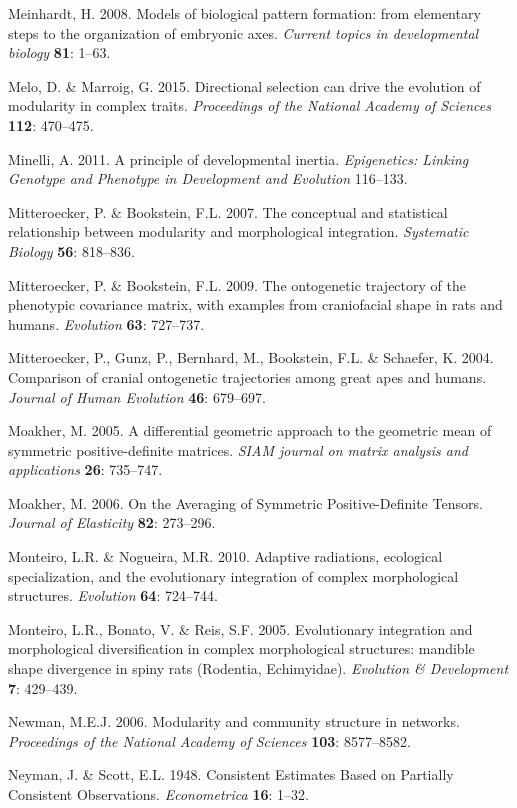 \documentclass[12pt,twoside]{report}
\begin{document}
Meinhardt, H. 2008. Models of biological pattern formation: from
elementary steps to the organization of embryonic axes. \emph{Current
topics in developmental biology} \textbf{81}: 1--63.

Melo, D. \& Marroig, G. 2015. Directional selection can drive the
evolution of modularity in complex traits. \emph{Proceedings of the
National Academy of Sciences} \textbf{112}: 470--475.

Minelli, A. 2011. A principle of developmental inertia.
\emph{Epigenetics: Linking Genotype and Phenotype in Development and
Evolution} 116--133.

Mitteroecker, P. \& Bookstein, F.L. 2007. The conceptual and statistical
relationship between modularity and morphological integration.
\emph{Systematic Biology} \textbf{56}: 818--836.

Mitteroecker, P. \& Bookstein, F.L. 2009. The ontogenetic trajectory of
the phenotypic covariance matrix, with examples from craniofacial shape
in rats and humans. \emph{Evolution} \textbf{63}: 727--737.

Mitteroecker, P., Gunz, P., Bernhard, M., Bookstein, F.L. \& Schaefer,
K. 2004. Comparison of cranial ontogenetic trajectories among great apes
and humans. \emph{Journal of Human Evolution} \textbf{46}: 679--697.

Moakher, M. 2005. A differential geometric approach to the geometric
mean of symmetric positive-definite matrices. \emph{SIAM journal on
matrix analysis and applications} \textbf{26}: 735--747.

Moakher, M. 2006. On the Averaging of Symmetric Positive-Definite
Tensors. \emph{Journal of Elasticity} \textbf{82}: 273--296.

Monteiro, L.R. \& Nogueira, M.R. 2010. Adaptive radiations, ecological
specialization, and the evolutionary integration of complex
morphological structures. \emph{Evolution} \textbf{64}: 724--744.

Monteiro, L.R., Bonato, V. \& Reis, S.F. 2005. Evolutionary integration
and morphological diversification in complex morphological structures:
mandible shape divergence in spiny rats (Rodentia, Echimyidae).
\emph{Evolution \& Development} \textbf{7}: 429--439.

Newman, M.E.J. 2006. Modularity and community structure in networks.
\emph{Proceedings of the National Academy of Sciences} \textbf{103}:
8577--8582.

Neyman, J. \& Scott, E.L. 1948. Consistent Estimates Based on Partially
Consistent Observations. \emph{Econometrica} \textbf{16}: 1--32.
\end{document}
